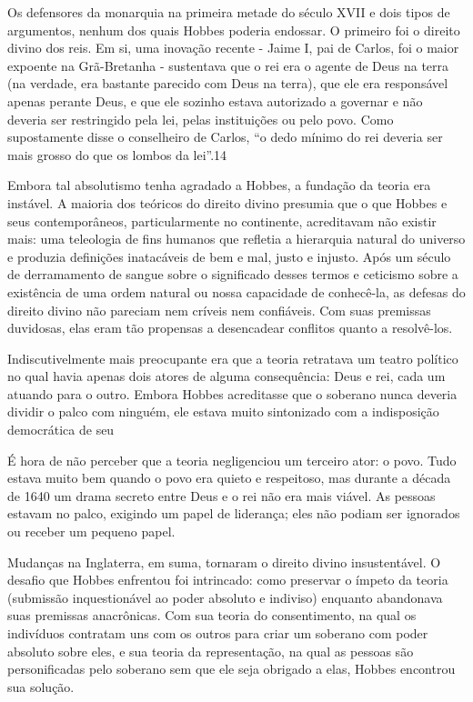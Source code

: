  \par 
Os defensores da monarquia na primeira metade do século XVII e dois tipos de argumentos, nenhum dos quais Hobbes poderia endossar. O primeiro foi o direito divino dos reis. Em si, uma inovação recente - Jaime I, pai de Carlos, foi o maior expoente na Grã-Bretanha - sustentava que o rei era o agente de Deus na terra (na verdade, era bastante parecido com Deus na terra), que ele era responsável apenas perante Deus, e que ele sozinho estava autorizado a governar e não deveria ser restringido pela lei, pelas instituições ou pelo povo. Como supostamente disse o conselheiro de Carlos, “o dedo mínimo do rei deveria ser mais grosso do que os lombos da lei”.{\color{blue}14}
 \par 
Embora tal absolutismo tenha agradado a Hobbes, a fundação da teoria era instável. A maioria dos teóricos do direito divino presumia que o que Hobbes e seus contemporâneos, particularmente no continente, acreditavam não existir mais: uma teleologia de fins humanos que refletia a hierarquia natural do universo e produzia definições inatacáveis ​​de bem e mal, justo e injusto. Após um século de derramamento de sangue sobre o significado desses termos e ceticismo sobre a existência de uma ordem natural ou nossa capacidade de conhecê-la, as defesas do direito divino não pareciam nem críveis nem confiáveis. Com suas premissas duvidosas, elas eram tão propensas a desencadear conflitos quanto a resolvê-los.
 \par 
Indiscutivelmente mais preocupante era que a teoria retratava um teatro político no qual havia apenas dois atores de alguma consequência: Deus e rei, cada um atuando para o outro. Embora Hobbes acreditasse que o soberano nunca deveria dividir o palco com ninguém, ele estava muito sintonizado com a indisposição democrática de seu
 \par 
É hora de não perceber que a teoria negligenciou um terceiro ator: o povo. Tudo estava muito bem quando o povo era quieto e respeitoso, mas durante a década de 1640 um drama secreto entre Deus e o rei não era mais viável. As pessoas estavam no palco, exigindo um papel de liderança; eles não podiam ser ignorados ou receber um pequeno papel.
 \par 
Mudanças na Inglaterra, em suma, tornaram o direito divino insustentável. O desafio que Hobbes enfrentou foi intrincado: como preservar o ímpeto da teoria (submissão inquestionável ao poder absoluto e indiviso) enquanto abandonava suas premissas anacrônicas. Com sua teoria do consentimento, na qual os indivíduos contratam uns com os outros para criar um soberano com poder absoluto sobre eles, e sua teoria da representação, na qual as pessoas são personificadas pelo soberano sem que ele seja obrigado a elas, Hobbes encontrou sua solução.
